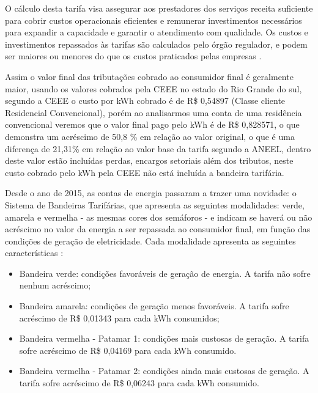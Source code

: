 O cálculo desta tarifa visa assegurar aos prestadores dos serviços receita suficiente para cobrir custos operacionais eficientes e remunerar investimentos necessários para expandir a capacidade e garantir o atendimento com qualidade. Os custos e investimentos repassados às tarifas são calculados pelo órgão regulador, e podem ser maiores ou menores do que os custos praticados pelas empresas \cite{ANEEL_TARIFA}.

Assim o valor final das tributações cobrado ao consumidor final é geralmente maior, usando os valores cobrados pela CEEE no estado do Rio Grande do sul, segundo a CEEE \cite{CEEE_TARIFA} o custo por kWh cobrado é de R\$ 0,54897 (Classe cliente Residencial Convencional), porém ao analisarmos uma conta de uma residência convencional veremos que o valor final pago pelo kWh é de R\$ 0,828571, o que demonstra um acréscimo de 50,8 \% em relação ao valor original, o que é uma diferença de 21,31\% em relação ao valor base da tarifa segundo a ANEEL, dentro deste valor estão incluídas perdas, encargos setoriais além dos tributos, neste custo cobrado pelo kWh pela CEEE não está incluída a bandeira tarifária.

Desde o ano de 2015, as contas de energia passaram a trazer uma novidade: o Sistema de Bandeiras Tarifárias, que apresenta as seguintes modalidades: verde, amarela e vermelha - as mesmas cores dos semáforos - e indicam se haverá ou não acréscimo no valor da energia a ser repassada ao consumidor final, em função das condições de geração de eletricidade. Cada modalidade apresenta as seguintes características \cite{ANEEL_BANDEIRAS}:

\begin{itemize}

    \item Bandeira verde: condições favoráveis de geração de energia. A tarifa não sofre nenhum acréscimo;

    \item Bandeira amarela: condições de geração menos favoráveis. A tarifa sofre acréscimo de R\$ 0,01343 para cada kWh consumidos;

    \item Bandeira vermelha - Patamar 1: condições mais custosas de geração. A tarifa sofre acréscimo de R\$ 0,04169 para cada kWh consumido.

    \item Bandeira vermelha - Patamar 2: condições ainda mais custosas de geração. A tarifa sofre acréscimo de R\$ 0,06243 para cada kWh consumido.

\end{itemize}

